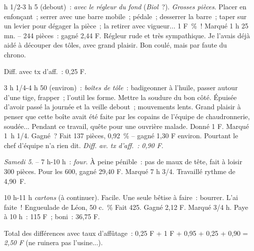 \documentclass[french,twoside]{book} %
\begin{document}
 h 1/2-3 h 5 (debout) : {\itshape avec le régleur du fond} ({\itshape Biol} ?). {\itshape Grosses pièces}. Placer en enfonçant ; serrer avec une barre mobile ; pédale ; desserrer la barre ; taper sur un levier pour dégager la pièce ; la retirer avec vigueur... 1 F \% ! Marqué 1 h 25 mn. – 244 pièces : gagné 2,44 F. Régleur rude et très sympathique. Je l'avais déjà aidé à découper des tôles, avec grand plaisir. Bon coulé, mais par faute du chrono.\par
Diff. avec tx d'aff. : 0,25 F.\par
3 h 1/4-4 h 50 (environ) : {\itshape boîtes de tôle} : badigeonner à l'huile, passer autour d'une tige, frapper ; l'outil les forme. Mettre la soudure du bon côté. Épuisée d'avoir passé la journée et la veille debout ; mouvements lents. Grand plaisir à penser que cette boîte avait été faite par les copains de l'équipe de chaudronnerie, soudée... Pendant ce travail, quête pour une ouvrière malade. Donné 1 F. Marqué 1 h 1/4. Gagné ? Fait 137 pièces, 0,92 \% – gagné 1,30 F environ. Pourtant le chef d'équipe n'a rien dit. {\itshape Diff. av. tx d'aff. : 0,90 F.}\par
{\itshape Samedi 5}. – 7 h-10 h : {\itshape four.} À peine pénible : pas de maux de tête, fait à loisir 300 pièces. Pour les 600, gagné 29,40 F. Marqué 7 h 3/4. Travaillé rythme de 4,90 F.\par
10 h-11 h {\itshape cartons} (à continuer). Facile. Une seule bêtise à faire : bourrer. L'ai faite ! Engueulade de Léon, 50 c. \% Fait 425. Gagné 2,12 F. Marqué 3/4 h. Paye à 10 h : 115 F ; boni : 36,75 F.\par
Total des différences avec taux d'affûtage : 0,25 F + 1 F + 0,95 + 0,25 + 0,90 = {\itshape 2,50 F} (ne ruinera pas l'usine...).
\end{document}
